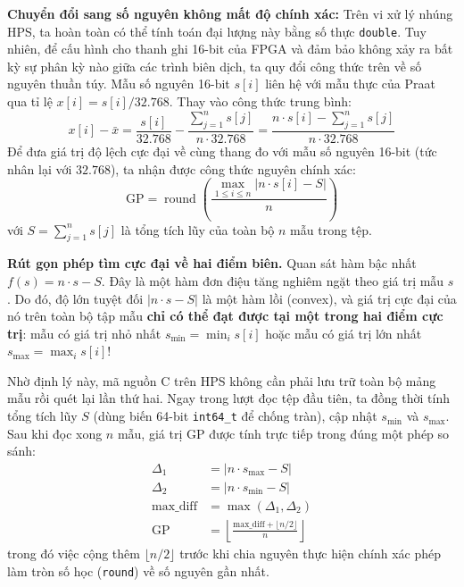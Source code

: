\textbf{Chuyển đổi sang số nguyên không mất độ chính xác:}
Trên vi xử lý nhúng HPS, ta hoàn toàn có thể tính toán đại lượng này bằng số thực \texttt{double}. Tuy nhiên, để cấu hình cho thanh ghi 16-bit của FPGA và đảm bảo không xảy ra bất kỳ sự phân kỳ nào giữa các trình biên dịch, ta quy đổi công thức trên về số nguyên thuần túy. Mẫu số nguyên 16-bit $s[i]$ liên hệ với mẫu thực của Praat qua tỉ lệ $x[i] = s[i] / 32.768$. Thay vào công thức trung bình:
\begin{equation}
x[i] - \bar{x} = \frac{s[i]}{32.768} - \frac{\sum_{j=1}^n s[j]}{n \cdot 32.768} = \frac{n \cdot s[i] - \sum_{j=1}^n s[j]}{n \cdot 32.768}
\end{equation}
Để đưa giá trị độ lệch cực đại về cùng thang đo với mẫu số nguyên 16-bit (tức nhân lại với $32.768$), ta nhận được công thức nguyên chính xác:
\begin{equation}
\text{GP} = \operatorname{round}\left( \frac{\max_{1 \le i \le n} |n \cdot s[i] - S|}{n} \right)
\end{equation}
với $S = \sum_{j=1}^n s[j]$ là tổng tích lũy của toàn bộ $n$ mẫu trong tệp.

\textbf{Rút gọn phép tìm cực đại về hai điểm biên.}
Quan sát hàm bậc nhất $f(s) = n \cdot s - S$. Đây là một hàm đơn điệu tăng nghiêm ngặt theo giá trị mẫu $s$. Do đó, độ lớn tuyệt đối $|n \cdot s - S|$ là một hàm lồi (convex), và giá trị cực đại của nó trên toàn bộ tập mẫu \textbf{chỉ có thể đạt được tại một trong hai điểm cực trị}: mẫu có giá trị nhỏ nhất $s_{\min} = \min_i s[i]$ hoặc mẫu có giá trị lớn nhất $s_{\max} = \max_i s[i]$!

Nhờ định lý này, mã nguồn C trên HPS không cần phải lưu trữ toàn bộ mảng mẫu rồi quét lại lần thứ hai. Ngay trong lượt đọc tệp đầu tiên, ta đồng thời tính tổng tích lũy $S$ (dùng biến 64-bit \texttt{int64\_t} để chống tràn), cập nhật $s_{\min}$ và $s_{\max}$. Sau khi đọc xong $n$ mẫu, giá trị GP được tính trực tiếp trong đúng một phép so sánh:
\begin{align}
\Delta_1 &= |n \cdot s_{\max} - S| \\
\Delta_2 &= |n \cdot s_{\min} - S| \\
\text{max\_diff} &= \max(\Delta_1, \Delta_2) \\
\text{GP} &= \left\lfloor \frac{\text{max\_diff} + \lfloor n / 2 \rfloor}{n} \right\rfloor
\end{align}
trong đó việc cộng thêm $\lfloor n / 2 \rfloor$ trước khi chia nguyên thực hiện chính xác phép làm tròn số học (\texttt{round}) về số nguyên gần nhất.

